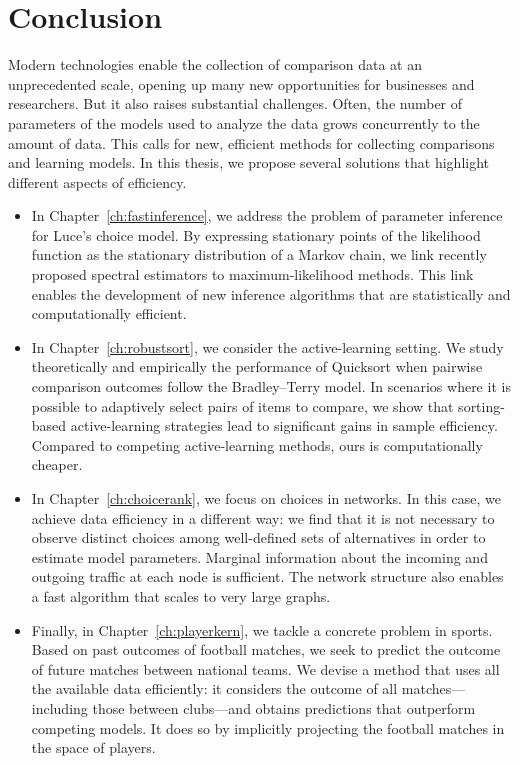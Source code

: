 \chapter{Conclusion}
\label{ch:conclusion}

Modern technologies enable the collection of comparison data at an unprecedented scale, opening up many new opportunities for businesses and researchers.
But it also raises substantial challenges.
Often, the number of parameters of the models used to analyze the data grows concurrently to the amount of data.
This calls for new, efficient methods for collecting comparisons and learning models.
In this thesis, we propose several solutions that highlight different aspects of efficiency.

\begin{itemize}
\item In Chapter~\ref{ch:fastinference}, we address the problem of parameter inference for Luce's choice model.
By expressing stationary points of the likelihood function as the stationary distribution of a Markov chain, we link recently proposed spectral estimators to maximum-likelihood methods.
This link enables the development of new inference algorithms that are statistically and computationally efficient.

\item In Chapter~\ref{ch:robustsort}, we consider the active-learning setting.
We study theoretically and empirically the performance of Quicksort when pairwise comparison outcomes follow the Bradley--Terry model.
In scenarios where it is possible to adaptively select pairs of items to compare, we show that sorting-based active-learning strategies lead to significant gains in sample efficiency.
Compared to competing active-learning methods, ours is computationally cheaper.

\item In Chapter~\ref{ch:choicerank}, we focus on choices in networks.
In this case, we achieve data efficiency in a different way: we find that it is not necessary to observe distinct choices among well-defined sets of alternatives in order to estimate model parameters.
Marginal information about the incoming and outgoing traffic at each node is sufficient.
The network structure also enables a fast algorithm that scales to very large graphs.

\item Finally, in Chapter~\ref{ch:playerkern}, we tackle a concrete problem in sports.
Based on past outcomes of football matches, we seek to predict the outcome of future matches between national teams.
We devise a method that uses all the available data efficiently: it considers the outcome of all matches---including those between clubs---and obtains predictions that outperform competing models.
It does so by implicitly projecting the football matches in the space of players.
\end{itemize}

